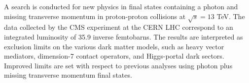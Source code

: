 % 
% 
%
A search is conducted for new physics in final states containing a photon and missing transverse momentum in proton-proton collisions at $\sqrt{s} = 13$ TeV.
The data collected by the CMS experiment at the CERN LHC correspond to an integrated luminosity of 35.9 inverse femtobarns.
The results are interpreted as exclusion limits on the various dark matter models, such as heavy vector mediators, dimension-7 contact operators, and Higgs-portal dark sectors.
Improved limits are set with respect to previous analyses using photon plus missing transverse momentum final states.
